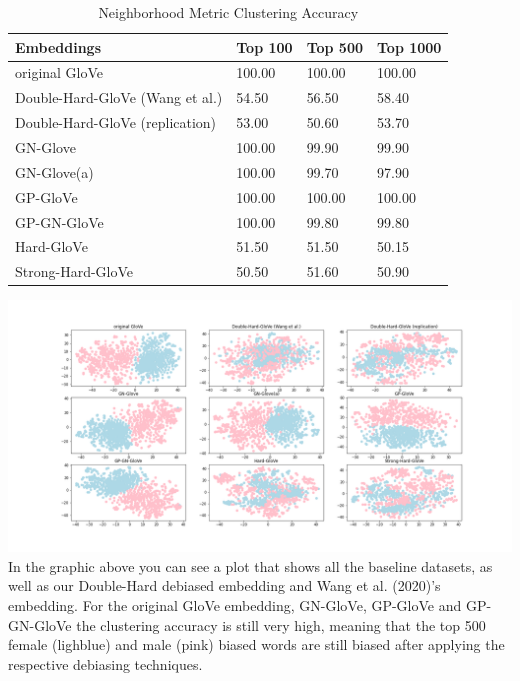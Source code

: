 \documentclass[
  english,
  man,floatsintext]{apa6}
\begin{document}
\begin{table}[tbp]

\begin{center}
\begin{threeparttable}

\caption{\label{tab:table 2}Neighborhood Metric Clustering Accuracy}

\begin{tabular}{llll}
\toprule
Embeddings & Top 100 & Top 500 & Top 1000\\
\midrule
original GloVe & 100.00 & 100.00 & 100.00\\
Double-Hard-GloVe (Wang et al.) & 54.50 & 56.50 & 58.40\\
Double-Hard-GloVe (replication) & 53.00 & 50.60 & 53.70\\
GN-Glove & 100.00 & 99.90 & 99.90\\
GN-Glove(a) & 100.00 & 99.70 & 97.90\\
GP-GloVe & 100.00 & 100.00 & 100.00\\
GP-GN-GloVe & 100.00 & 99.80 & 99.80\\
Hard-GloVe & 51.50 & 51.50 & 50.15\\
Strong-Hard-GloVe & 50.50 & 51.60 & 50.90\\
\bottomrule
\end{tabular}

\end{threeparttable}
\end{center}

\end{table}

\includegraphics{code/evaluation_results/results_tsne.png}
In the graphic above you can see a plot that shows all the baseline datasets, as well as our Double-Hard debiased embedding and Wang et al. (2020)'s embedding. For the original GloVe embedding, GN-GloVe, GP-GloVe and GP-GN-GloVe the clustering accuracy is still very high, meaning that the top 500 female (lighblue) and male (pink) biased words are still biased after applying the respective debiasing techniques.
\end{document}
